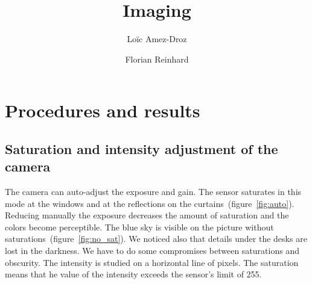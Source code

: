 \documentclass[a4paper, 12pt]{paper}
\author{Loïc Amez-Droz \and Florian Reinhard}
\title{Imaging}
\begin{document}

\section{Procedures and results}
\subsection{Saturation and intensity adjustment of the camera}
\label{sec:saturation}

The camera can auto-adjust the exposure and gain.
The sensor saturates in this mode at the windows and at the reflections on the curtains~(figure~\ref{fig:auto}).
Reducing manually the exposure decreases the amount of saturation and the colors become perceptible.
The blue sky is visible on the picture without saturations~(figure~\ref{fig:no_sat}).
We noticed also that details under the desks are lost in the darkness.
We have to do some compromises between saturations and obscurity.
The intensity is studied on a horizontal line of pixels.
The saturation means that he value of the intensity exceeds the sensor's limit of 255.
\end{document}
